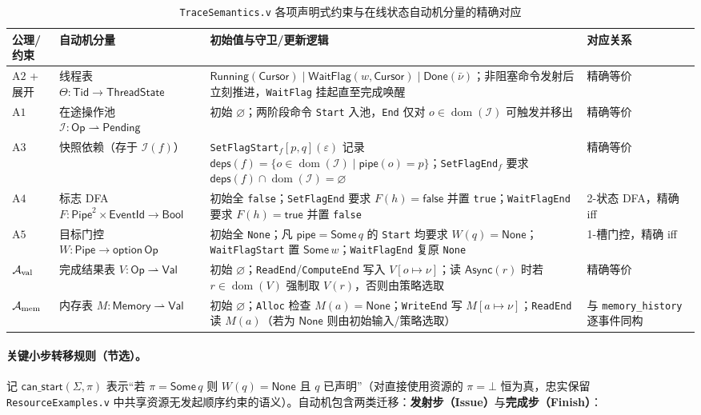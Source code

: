 \documentclass[UTF8,a4paper,11pt,fontset=fandol]{ctexart}
\newcommand{\code}[1]{\texttt{#1}}
\newcommand{\kw}[1]{\mathsf{#1}}
\newcommand{\dom}{\operatorname{dom}}
\newcommand{\Eid}{\mathsf{EventId}}
\newcommand{\Val}{\mathsf{Val}}
\newcommand{\Pipe}{\mathsf{Pipe}}
\newcommand{\Bool}{\mathsf{Bool}}
\newcommand{\Mem}{\mathsf{Memory}}
\newcommand{\Ops}{\mathsf{Op}}
\newcommand{\pipe}{\mathsf{pipe}}
\begin{document}
\begin{table}[htbp]
\centering
\small
\caption{\code{TraceSemantics.v} 各项声明式约束与在线状态自动机分量的精确对应}
\label{tab:axiom-automaton}
\begin{tabularx}{\linewidth}{@{}p{1.65cm}p{3.35cm}Yp{2.35cm}@{}}
\toprule
公理/约束 & 自动机分量 & 初始值与守卫/更新逻辑 & 对应关系 \\
\midrule
$\mathrm{A2}$ + 展开 & 线程表 $\Theta : \mathsf{Tid} \to \mathsf{ThreadState}$ & $\mathsf{Running}(\mathsf{Cursor}) \mid \mathsf{WaitFlag}(w, \mathsf{Cursor}) \mid \mathsf{Done}(\bar\nu)$；非阻塞命令发射后立刻推进，\code{WaitFlag} 挂起直至完成唤醒 & 精确等价 \\
$\mathrm{A1}$ & 在途操作池 $\mathcal I : \Ops \rightharpoonup \mathsf{Pending}$ & 初始 $\varnothing$；两阶段命令 \code{Start} 入池，\code{End} 仅对 $o \in \dom(\mathcal I)$ 可触发并移出 & 精确等价 \\
$\mathrm{A3}$ & 快照依赖（存于 $\mathcal I(f)$） & \code{SetFlagStart}$_f[p,q](\varepsilon)$ 记录 $\mathsf{deps}(f)=\{o\in\dom(\mathcal I)\mid\pipe(o)=p\}$；\code{SetFlagEnd}$_f$ 要求 $\mathsf{deps}(f)\cap\dom(\mathcal I)=\varnothing$ & 精确等价 \\
$\mathrm{A4}$ & 标志 DFA $F : \Pipe^2\times\Eid \to \Bool$ & 初始全 \code{false}；\code{SetFlagEnd} 要求 $F(h)=\kw{false}$ 并置 \code{true}；\code{WaitFlagEnd} 要求 $F(h)=\kw{true}$ 并置 \code{false} & 2-状态 DFA，精确 iff \\
$\mathrm{A5}$ & 目标门控 $W : \Pipe \to \mathsf{option}\,\Ops$ & 初始全 \code{None}；凡 $\pipe=\kw{Some}\,q$ 的 \code{Start} 均要求 $W(q)=\kw{None}$；\code{WaitFlagStart} 置 $\kw{Some}\,w$；\code{WaitFlagEnd} 复原 \code{None} & 1-槽门控，精确 iff \\
$\mathcal A_{\rm val}$ & 完成结果表 $V : \Ops \rightharpoonup \Val$ & 初始 $\varnothing$；\code{ReadEnd}/\code{ComputeEnd} 写入 $V[o\mapsto\nu]$；读 $\kw{Async}(r)$ 时若 $r\in\dom(V)$ 强制取 $V(r)$，否则由策略选取 & 精确等价 \\
$\mathcal A_{\rm mem}$ & 内存表 $M : \Mem \rightharpoonup \Val$ & 初始 $\varnothing$；\code{Alloc} 检查 $M(a)=\kw{None}$；\code{WriteEnd} 写 $M[a\mapsto\nu]$；\code{ReadEnd} 读 $M(a)$（若为 $\kw{None}$ 则由初始输入/策略选取） & 与 \code{memory\_\allowbreak history} 逐事件同构 \\
\bottomrule
\end{tabularx}
\end{table}

\paragraph{关键小步转移规则（节选）。}
记 $\mathsf{can\_start}(\Sigma, \pi)$ 表示“若 $\pi = \kw{Some}\,q$ 则 $W(q) = \kw{None}$ 且 $q$ 已声明”（对直接使用资源的 $\pi = \bot$ 恒为真，忠实保留 \code{ResourceExamples.v} 中共享资源无发起顺序约束的语义）。自动机包含两类迁移：\textbf{发射步（Issue）}与\textbf{完成步（Finish）}：
\end{document}
